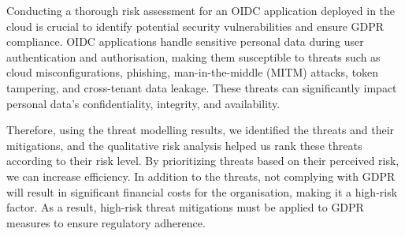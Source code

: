 Conducting a thorough risk assessment for an OIDC application deployed in the cloud is crucial to identify potential security vulnerabilities and ensure GDPR compliance. OIDC applications handle sensitive personal data during user authentication and authorisation, making them susceptible to threats such as cloud misconfigurations, phishing, man-in-the-middle (MITM) attacks, token tampering, and cross-tenant data leakage. These threats can significantly impact personal data's confidentiality, integrity, and availability. 

Therefore, using the threat modelling results, we identified the threats and their mitigations, and the qualitative risk analysis helped us rank these threats according to their risk level. By prioritizing threats based on their perceived risk, we can increase efficiency. In addition to the threats, not complying with GDPR will result in significant financial costs for the organisation, making it a high-risk factor. As a result, high-risk threat mitigations must be applied to GDPR measures to ensure regulatory adherence. 








